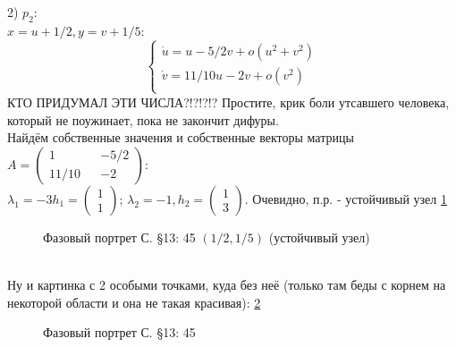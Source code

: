 \documentclass{article}
\begin{document}
2) $p_2$:\\
$x=u+1/2,y=v+1/5$:
\begin{equation}
\begin{cases}
        \dot{u}=u-5/2v+o(u^2+v^2)\\
        \dot{v}=11/10u-2v+o(v^2)\\
    \end{cases}    
\end{equation}
КТО ПРИДУМАЛ ЭТИ ЧИСЛА?!?!?!? Простите, крик боли утсавшего человека, который не поужинает, пока не закончит дифуры.\\
Найдём собственные значения и собственные векторы матрицы $A=\begin{pmatrix} 1 && -5/2 \\ 11/10 && -2 \end{pmatrix}$:\\
 $\lambda_1=-3
 h_1 = \begin{pmatrix} 1 \\  1 \end{pmatrix} $; 
 $\lambda_2= -1,
 h_2 = \begin{pmatrix} 1 \\  3 \end{pmatrix} $. 
 Очевидно, п.р. - устойчивый узел \ref{13.45.2}
 \begin{figure}[ht]
\caption{Фазовый портрет С. \S13: 45 $(1/2,1/5)$ (устойчивый узел)}
\label{13.45.2}
\end{figure}\\  
Ну и картинка с 2 особыми точками, куда без неё (только там беды с корнем на некоторой области и она не такая красивая): \ref{13.45.3}\\
 \begin{figure}[ht]
\caption{Фазовый портрет С. \S13: 45}
\label{13.45.3}
\end{figure}\\
\end{document}
